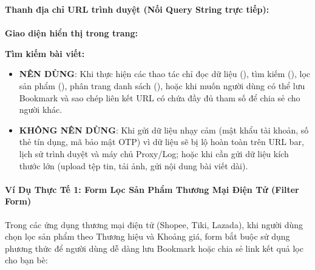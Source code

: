 \begin{browserWindow}
\sffamily\small
\textbf{Thanh địa chỉ URL trình duyệt (Nối Query String trực tiếp):} \\[3pt]
 \\[8pt]
\textbf{Giao diện hiển thị trong trang:} \\[4pt]
\begin{tcolorbox}[colback=white, colframe=accentOrange!20, arc=4pt, boxrule=0.6pt, left=8pt, right=8pt, top=8pt, bottom=8pt]
  \textbf{Tìm kiếm bài viết:} \\[2pt]
  \tcbox[on line, arc=3pt, colback=codeBg, colframe=codeBorder, boxsep=2pt, left=6pt, right=40pt]{\textcolor{darkText}{HTML5 Masterclass}} \quad
\end{tcolorbox}
\end{browserWindow}

\begin{tipBox}
\begin{itemize}[leftmargin=1.5em, itemsep=3pt, parsep=0pt]
    \item \textbf{NÊN DÙNG}: Khi thực hiện các thao tác chỉ đọc dữ liệu (), tìm kiếm (), lọc sản phẩm (), phân trang danh sách (), hoặc khi muốn người dùng có thể lưu Bookmark và sao chép liên kết URL có chứa đầy đủ tham số để chia sẻ cho người khác.
    \item \textbf{KHÔNG NÊN DÙNG}: Khi gửi dữ liệu nhạy cảm (mật khẩu tài khoản, số thẻ tín dụng, mã bảo mật OTP) vì dữ liệu sẽ bị lộ hoàn toàn trên URL bar, lịch sử trình duyệt và máy chủ Proxy/Log; hoặc khi cần gửi dữ liệu kích thước lớn (upload tệp tin, tải ảnh, gửi nội dung bài viết dài).
\end{itemize}
\end{tipBox}

\paragraph{Ví Dụ Thực Tế 1: Form Lọc Sản Phẩm Thương Mại Điện Tử (Filter Form)}
Trong các ứng dụng thương mại điện tử (Shopee, Tiki, Lazada), khi người dùng chọn lọc sản phẩm theo Thương hiệu và Khoảng giá, form bắt buộc sử dụng phương thức  để người dùng dễ dàng lưu Bookmark hoặc chia sẻ link kết quả lọc cho bạn bè:

